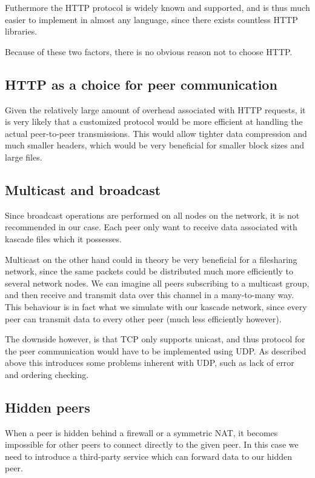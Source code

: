 \documentclass{acm_proc_article-sp}
\begin{document}
Futhermore the HTTP protocol is widely known and supported, and is thus much easier to implement in almost any language, since there exists countless HTTP libraries. 

Because of these two factors, there is no obvious reason not to choose HTTP.

\subsection{HTTP as a choice for peer communication}
Given the relatively large amount of overhead associated with HTTP requests, it is very likely that a customized protocol would be more efficient at handling the actual peer-to-peer transmissions.
This would allow tighter data compression and much smaller headers, which would be very beneficial for smaller block sizes and large files.

\subsection{Multicast and broadcast}
Since broadcast operations are performed on all nodes on the network, it is not recommended in our case. Each peer only want to receive data associated with kascade files which it possesses.

Multicast on the other hand could in theory be very beneficial for a filesharing network, since the same packets could be distributed much more efficiently to several network nodes. We can imagine all peers subscribing to a multicast group, and then receive and transmit data over this channel in a many-to-many way.
This behaviour is in fact what we simulate with our kascade network, since every peer can transmit data to every other peer (much less efficiently however).

The downside however, is that TCP only supports unicast, and thus protocol for the peer communication would have to be implemented using UDP. As described above this introduces some problems inherent with UDP, such as lack of error and ordering checking. 

\subsection{Hidden peers}
When a peer is hidden behind a firewall or a symmetric NAT, it becomes impossible for other peers to connect directly to the given peer. In this case we need to introduce a third-party service which can forward data to our hidden peer.
\end{document}
